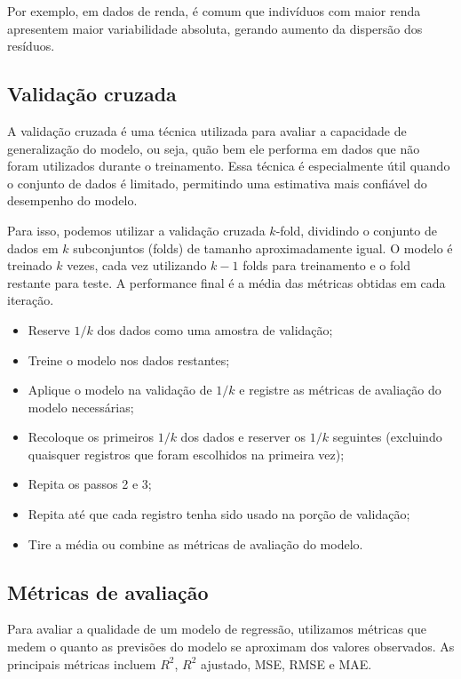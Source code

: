 \documentclass{article}
\begin{document}
Por exemplo, em dados de renda, é comum que indivíduos com maior renda
apresentem maior variabilidade absoluta, gerando aumento da dispersão
dos resíduos.



\subsection{Validação cruzada}

A validação cruzada é uma técnica utilizada para avaliar a capacidade de generalização
do modelo, ou seja, quão bem ele performa em dados que não foram utilizados durante o 
treinamento. Essa técnica é especialmente útil quando o conjunto de dados é limitado,
permitindo uma estimativa mais confiável do desempenho do modelo.

Para isso, podemos utilizar a validação cruzada $k$-fold, dividindo o conjunto de dados
em $k$ subconjuntos (folds) de tamanho aproximadamente igual. O modelo é treinado $k$ vezes,
cada vez utilizando $k -1$ folds para treinamento e o fold restante para teste. A performance
final é a média das métricas obtidas em cada iteração.

\begin{itemize}
    \item Reserve $1/k$ dos dados como uma amostra de validação;
    \item Treine o modelo nos dados restantes;
    \item Aplique o modelo na validação de $1/k$ e registre as métricas de avaliação do modelo necessárias;
    \item Recoloque os primeiros $1/k$ dos dados e reserver os $1/k$ seguintes (excluindo quaisquer registros que foram escolhidos na primeira vez);
    \item Repita os passos 2 e 3;
    \item Repita até que cada registro tenha sido usado na porção de validação;
    \item Tire a média ou combine as métricas de avaliação do modelo.
\end{itemize}

\subsection{Métricas de avaliação}

Para avaliar a qualidade de um modelo de regressão, utilizamos métricas que medem
o quanto as previsões do modelo se aproximam dos valores observados. As principais
métricas incluem $R^2$, $R^2$ ajustado, MSE, RMSE e MAE.
\end{document}
